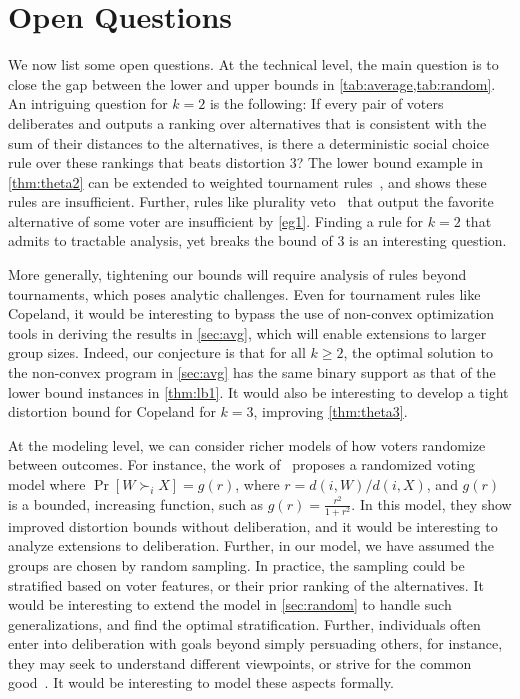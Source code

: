 \section{Open Questions}
We now list some open questions. At the technical level, the main question is to close the gap between the lower and upper bounds in \cref{tab:average,tab:random}. An intriguing question for $k=2$ is the following: If every pair of voters deliberates and outputs a ranking over alternatives that is consistent with the sum of their distances to the alternatives, is there a deterministic social choice rule over these rankings that beats distortion $3$? The lower bound example in \cref{thm:theta2} can be extended to weighted tournament rules~\cite{MunagalaW19,Kempe_2020}, and shows these rules are insufficient. Further, rules like plurality veto~\cite{Kizilkaya022} that output the favorite alternative of some voter are insufficient by \cref{eg1}. Finding a rule for $k=2$  that admits to tractable analysis, yet breaks the bound of $3$ is an interesting question.

More generally, tightening our bounds will require analysis of rules beyond tournaments, which poses analytic challenges. Even for tournament rules like Copeland, it would be interesting to bypass the use of non-convex optimization tools in deriving the results in \cref{sec:avg}, which will enable extensions to larger group sizes. Indeed, our conjecture is that  for all $k \ge 2$, the optimal solution to the non-convex program in \cref{sec:avg} has the same binary support as that of the lower bound instances in \cref{thm:lb1}. It would also be interesting to develop a tight distortion bound for Copeland for $k=3$, improving \cref{thm:theta3}. 

At the modeling level, we can consider richer models of how voters randomize between outcomes. For instance, the work of~\cite{goyal2025metricdistortionprobabilisticvoting}  proposes a randomized voting model where $\Pr[W \succ_i X] = g(r)$, where $r = d(i,W)/d(i,X)$, and $g(r)$ is a bounded, increasing function, such as $g(r) = \frac{r^2}{1+r^2}$. In this model, they show improved distortion bounds without deliberation, and it would be interesting to analyze extensions to deliberation. Further, in our model, we have assumed the groups are chosen by random sampling.  In practice, the sampling could be stratified based on voter features, or their prior ranking of the alternatives. It would be interesting to extend the model in \cref{sec:random} to handle such generalizations, and find the optimal stratification. Further, individuals often enter into deliberation with goals beyond simply persuading others, for instance, they may seek to understand different viewpoints, or strive for the common good~\cite{ashkinaze2024}. It would be interesting to model  these aspects formally. 

